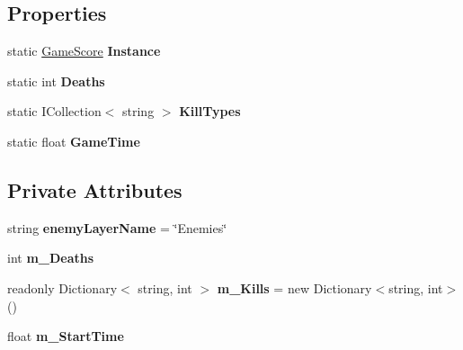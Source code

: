 \subsection*{Properties}
\begin{DoxyCompactItemize}
\item 
\mbox{\label{class_game_score_a4aab0f7e433705d361cd156cafc25a0f}} 
static \hyperlink{class_game_score}{Game\+Score} {\bfseries Instance}
\item 
\mbox{\label{class_game_score_a13acbbd1ae6ca8c027269624c007ab17}} 
static int {\bfseries Deaths}
\item 
\mbox{\label{class_game_score_aee833daec5b8a6952ae99ccc6c999a7e}} 
static I\+Collection$<$ string $>$ {\bfseries Kill\+Types}
\item 
\mbox{\label{class_game_score_a18b91f5395d48e82fd7458910d41502c}} 
static float {\bfseries Game\+Time}
\end{DoxyCompactItemize}
\subsection*{Private Attributes}
\begin{DoxyCompactItemize}
\item 
\mbox{\label{class_game_score_a427eeb8ae614bef4a15b0848a83a2234}} 
string {\bfseries enemy\+Layer\+Name} = \char`\"{}Enemies\char`\"{}
\item 
\mbox{\label{class_game_score_ac207f9470ebe518907eea299fb12ea7b}} 
int {\bfseries m\+\_\+\+Deaths}
\item 
\mbox{\label{class_game_score_a669e894e1dd12ac70ff3c0fa36b296f9}} 
readonly Dictionary$<$ string, int $>$ {\bfseries m\+\_\+\+Kills} = new Dictionary$<$string, int$>$()
\item 
\mbox{\label{class_game_score_a47aab34f5b107b4ee0691285600512cf}} 
float {\bfseries m\+\_\+\+Start\+Time}
\end{DoxyCompactItemize}
